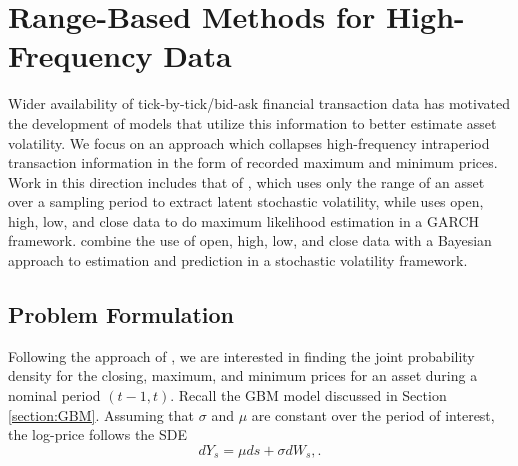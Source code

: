\chapter{Range-Based Methods for High-Frequency Data} \label{chapter:2}

Wider availability of tick-by-tick/bid-ask financial transaction data has motivated the development of models that utilize this information to better estimate asset volatility. We focus on an approach which collapses high-frequency intraperiod transaction information in the form of recorded maximum and minimum prices. Work in this direction includes that of \cite{alizadeh2002range}, which uses only the range of an asset over a sampling period to extract latent stochastic volatility, while \cite{lildholdt2002estimation} uses open, high, low, and close data to do maximum likelihood estimation in a GARCH framework. \cite{rodriguez2012} combine the use of open, high, low, and close data with a Bayesian approach to estimation and prediction in a stochastic volatility framework. 

\section{Problem Formulation}
Following the approach of \cite{rodriguez2012}, we are interested in finding the joint probability density for the closing, maximum, and minimum prices for an asset during a nominal period $(t-1, t)$. 
Recall the GBM model discussed in Section \ref{section:GBM}. Assuming that $\sigma$ and $\mu$ are constant over the period of interest, the log-price follows the SDE
\begin{equation}
	dY_s = \mu ds + \sigma dW_s, \label{eq:SDE}.
\end{equation}

